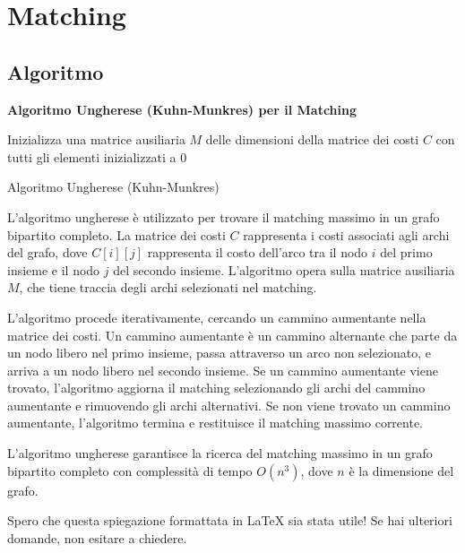 
\chapter{Matching}

\section{Algoritmo}


\textbf{Algoritmo Ungherese (Kuhn-Munkres) per il Matching}

\begin{algorithm}[H]
\SetAlgoLined
{}

Inizializza una matrice ausiliaria $M$ delle dimensioni della matrice dei costi $C$ con tutti gli elementi inizializzati a $0$\;


\;
\caption{Algoritmo Ungherese (Kuhn-Munkres)}
\end{algorithm}

L'algoritmo ungherese è utilizzato per trovare il matching massimo in un grafo bipartito completo. La matrice dei costi $C$ rappresenta i costi associati agli archi del grafo, dove $C[i][j]$ rappresenta il costo dell'arco tra il nodo $i$ del primo insieme e il nodo $j$ del secondo insieme. L'algoritmo opera sulla matrice ausiliaria $M$, che tiene traccia degli archi selezionati nel matching.

L'algoritmo procede iterativamente, cercando un cammino aumentante nella matrice dei costi. Un cammino aumentante è un cammino alternante che parte da un nodo libero nel primo insieme, passa attraverso un arco non selezionato, e arriva a un nodo libero nel secondo insieme. Se un cammino aumentante viene trovato, l'algoritmo aggiorna il matching selezionando gli archi del cammino aumentante e rimuovendo gli archi alternativi. Se non viene trovato un cammino aumentante, l'algoritmo termina e restituisce il matching massimo corrente.

L'algoritmo ungherese garantisce la ricerca del matching massimo in un grafo bipartito completo con complessità di tempo $O(n^3)$, dove $n$ è la dimensione del grafo.

Spero che questa spiegazione formattata in LaTeX sia stata utile! Se hai ulteriori domande, non esitare a chiedere.
